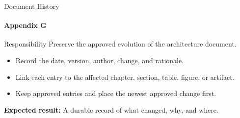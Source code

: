 \begin{frame}{Document History}
\framesubtitle{Appendix G}
\begin{block}{Responsibility}
Preserve the approved evolution of the architecture document.
\end{block}
\begin{itemize}
  \item Record the date, version, author, change, and rationale.
  \item Link each entry to the affected chapter, section, table, figure, or artifact.
  \item Keep approved entries and place the newest approved change first.
\end{itemize}
\vspace{0.15cm}
\textbf{Expected result:} A durable record of what changed, why, and where.
\end{frame}
